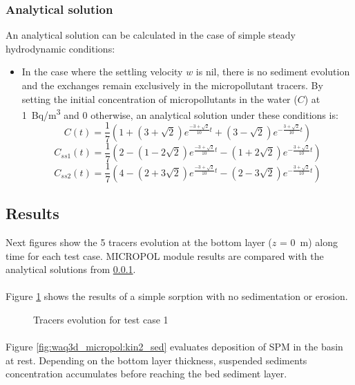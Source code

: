\subsubsection{Analytical solution}
\label{Analytical}
An analytical solution can be calculated in the case of simple steady hydrodynamic conditions:
\begin{itemize}
\item In the case where the settling velocity $w$ is nil, there is no
  sediment evolution and the exchanges remain exclusively in the
  micropollutant tracers. By setting the initial concentration of
  micropollutants in the water ($C$) at 1~Bq/m\textsuperscript{3}
  and 0 otherwise, an analytical solution under these conditions is:
  $$ C(t)=\frac{1}{7}(1+(3+\sqrt{2})e^{\frac{-3+\sqrt{2}}{10}t}+(3-\sqrt{2})e^{-\frac{3+\sqrt{2}}{10}t})$$
  $$ C_{ss1}(t)=\frac{1}{7}(2-(1-2\sqrt{2})e^{\frac{-3+\sqrt{2}}{10}t}-(1+2\sqrt{2})e^{-\frac{3+\sqrt{2}}{10}t})$$
  $$ C_{ss2}(t)=\frac{1}{7}(4-(2+3\sqrt{2})e^{\frac{-3+\sqrt{2}}{10}t}-(2-3\sqrt{2})e^{-\frac{3+\sqrt{2}}{10}t})$$
\end{itemize}

\subsection{Results}

Next figures show the 5 tracers evolution at the bottom layer ($z$ = 0~m) along time for each test case.
MICROPOL module results are compared with the analytical solutions from \ref{Analytical}.

\paragraph{}
Figure \ref{fig:waq3d_micropol:kin2_sorp} shows the results of a simple sorption
with no sedimentation or erosion.

\begin{figure} [H]
\centering
{}
\caption{Tracers evolution for test case 1}
 \label{fig:waq3d_micropol:kin2_sorp}
\end{figure}

\paragraph{}
Figure \ref{fig:waq3d_micropol:kin2_sed} evaluates deposition of SPM in the
basin at rest. Depending on the bottom layer thickness, suspended sediments concentration accumulates before reaching the bed sediment layer.


